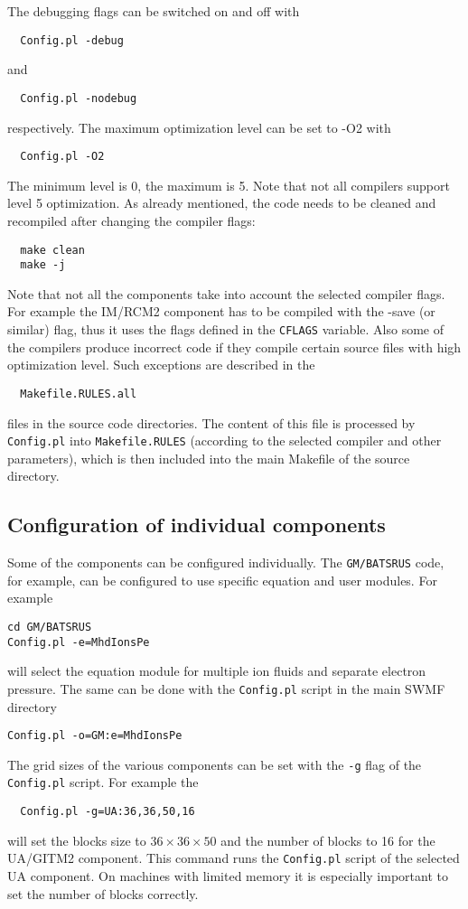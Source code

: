The debugging flags can be switched on and off with
\begin{verbatim}
  Config.pl -debug
\end{verbatim}
and
\begin{verbatim}
  Config.pl -nodebug
\end{verbatim}
respectively. The maximum optimization level can be set to -O2 with
\begin{verbatim}
  Config.pl -O2
\end{verbatim}
The minimum level is 0, the maximum is 5. Note that not all compilers support
level 5 optimization. As already mentioned, the code needs to be cleaned 
and recompiled after changing the compiler flags:
\begin{verbatim}
  make clean
  make -j
\end{verbatim}
Note that not all the components take into account the selected
compiler flags. For example the IM/RCM2 component has to be compiled 
with the -save (or similar) flag, thus it uses the flags defined in the 
{\tt CFLAGS} variable. Also some of the compilers produce incorrect
code if they compile certain source files with high optimization level.
Such exceptions are described in the 
\begin{verbatim}
  Makefile.RULES.all
\end{verbatim}
files in the source code directories. The content of this file
is processed by {\tt Config.pl} into {\tt Makefile.RULES}
(according to the selected compiler and other parameters),  
which is then included into the main Makefile of the source
directory.

\subsection{Configuration of individual components}

Some of the components can be configured individually. 
The {\tt GM/BATSRUS} code, for example, can be configured to
use specific equation and user modules.
For example
\begin{verbatim}
cd GM/BATSRUS
Config.pl -e=MhdIonsPe
\end{verbatim}
will select the equation module for multiple ion fluids and separate
electron pressure. The same can be done with the {\tt Config.pl} script
in the main SWMF directory
\begin{verbatim}
Config.pl -o=GM:e=MhdIonsPe
\end{verbatim}
The grid sizes of the various components can be set with the 
{\tt -g} flag of the {\tt Config.pl} script.
For example the
\begin{verbatim}
  Config.pl -g=UA:36,36,50,16
\end{verbatim}
will set the blocks size to $36\times 36\times 50$ and the number of blocks to 
16 for the UA/GITM2 component. This command runs the {\tt Config.pl}
script of the selected UA component. 
On machines with limited memory it is especially important to
set the number of blocks correctly. 

